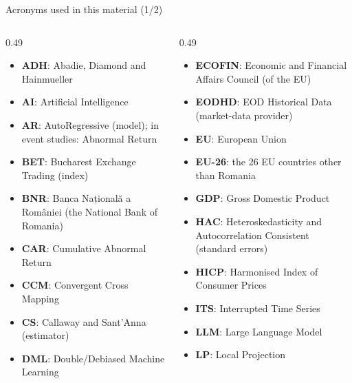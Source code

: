 \begin{frame}{Acronyms used in this material (1/2)}
\begin{columns}[T]
\begin{column}{0.49\textwidth}
\begin{itemize}\setlength{\itemsep}{0pt}
    \item \textbf{ADH}: Abadie, Diamond and Hainmueller
    \item \textbf{AI}: Artificial Intelligence
    \item \textbf{AR}: AutoRegressive (model); in event studies: Abnormal Return
    \item \textbf{BET}: Bucharest Exchange Trading (index)
    \item \textbf{BNR}: Banca Națională a României (the National Bank of Romania)
    \item \textbf{CAR}: Cumulative Abnormal Return
    \item \textbf{CCM}: Convergent Cross Mapping
    \item \textbf{CS}: Callaway and Sant'Anna (estimator)
    \item \textbf{DML}: Double/Debiased Machine Learning
\end{itemize}
\end{column}
\begin{column}{0.49\textwidth}
\begin{itemize}\setlength{\itemsep}{0pt}
    \item \textbf{ECOFIN}: Economic and Financial Affairs Council (of the EU)
    \item \textbf{EODHD}: EOD Historical Data (market-data provider)
    \item \textbf{EU}: European Union
    \item \textbf{EU-26}: the 26 EU countries other than Romania
    \item \textbf{GDP}: Gross Domestic Product
    \item \textbf{HAC}: Heteroskedasticity and Autocorrelation Consistent (standard errors)
    \item \textbf{HICP}: Harmonised Index of Consumer Prices
    \item \textbf{ITS}: Interrupted Time Series
    \item \textbf{LLM}: Large Language Model
    \item \textbf{LP}: Local Projection
\end{itemize}
\end{column}
\end{columns}
\end{frame}
